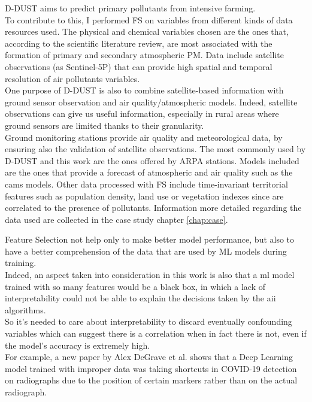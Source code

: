 \par
D-DUST aims to predict primary pollutants from intensive farming.\\ 
To contribute to this, I performed FS on variables from different kinds of data resources used.
The physical and chemical variables chosen are the ones that, according to the scientific literature review, are most associated with the formation of primary and secondary atmospheric PM. 
Data include satellite observations (as Sentinel-5P) that can provide high spatial and temporal resolution of air pollutants variables. \\
One purpose of D-DUST is also to combine satellite-based information with ground sensor observation and air quality/atmospheric models. Indeed, satellite observations can give us useful information, especially in rural areas where ground sensors are limited thanks to their granularity.\\
Ground monitoring stations provide air quality and meteorological data, by ensuring also the validation of satellite observations.
The most commonly used by D-DUST and this work are the ones offered by ARPA stations.
Models included are the ones that provide a forecast of atmospheric and air quality such as the \gls{cams} models.
Other data processed with FS include time-invariant territorial features such as population density, land use or vegetation indexes since are correlated to the presence of pollutants.
Information more detailed regarding the data used are collected in the case study chapter \ref{chap:case}.
\par
Feature Selection not help only to make better model performance, but also to have a better comprehension of the data that are used by ML models during training.\\ 
Indeed, an aspect taken into consideration in this work is also that a \acrshort{ml} model trained with so many features would be a black box, in which a lack of interpretability could not be able to explain the decisions taken by the \gls{aii} algorithms.\\
So it's needed to care about interpretability to discard eventually confounding variables which can suggest there is a correlation when in fact there is not, even if the model's accuracy is extremely high.\\
For example, a new paper by Alex DeGrave et al. \cite{degrave2021ai} shows that a Deep Learning model trained with improper data was taking shortcuts in COVID-19 detection on radiographs due to the position of certain markers rather than on the actual radiograph.
